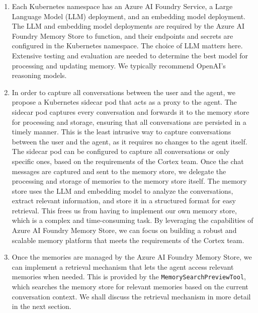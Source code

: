 \documentclass[9pt]{extarticle}%
\begin{document}
\begin{enumerate}[topsep=0pt]%
\item Each Kubernetes namespace has an Azure AI Foundry Service, a Large Language Model (LLM) deployment, and an embedding model deployment. The LLM and embedding model deployments are required by the Azure AI Foundry Memory Store to function, and their endpoints and secrets are configured in the Kubernetes namespace. The choice of LLM matters here. Extensive testing and evaluation are needed to determine the best model for processing and updating memory. We typically recommend OpenAI's reasoning models.%
\item In order to capture all conversations between the user and the agent, we propose a Kubernetes sidecar pod that acts as a proxy to the agent. The sidecar pod captures every conversation and forwards it to the memory store for processing and storage, ensuring that all conversations are persisted in a timely manner. This is the least intrusive way to capture conversations between the user and the agent, as it requires no changes to the agent itself. The sidecar pod can be configured to capture all conversations or only specific ones, based on the requirements of the Cortex team. Once the chat messages are captured and sent to the memory store, we delegate the processing and storage of memories to the memory store itself. The memory store uses the LLM and embedding model to analyze the conversations, extract relevant information, and store it in a structured format for easy retrieval. This frees us from having to implement our own memory store, which is a complex and time-consuming task. By leveraging the capabilities of Azure AI Foundry Memory Store, we can focus on building a robust and scalable memory platform that meets the requirements of the Cortex team.%
\item Once the memories are managed by the Azure AI Foundry Memory Store, we can implement a retrieval mechanism that lets the agent access relevant memories when needed. This is provided by the \texttt{MemorySearchPreviewTool}, which searches the memory store for relevant memories based on the current conversation context. We shall discuss the retrieval mechanism in more detail in the next section.%
\end{enumerate}%
\vspace{\baselineskip}%
\end{document}
